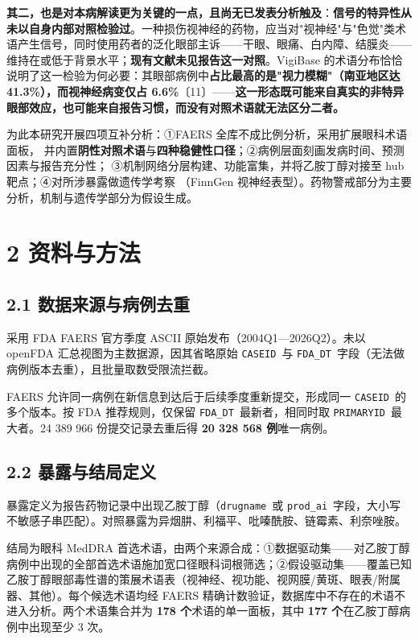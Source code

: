 \documentclass[UTF8,fontset=windows,11pt]{ctexart}
\begin{document}
\textbf{其二，也是对本病解读更为关键的一点，且尚无已发表分析触及}：\textbf{信号的特异性从未以自身内部对照检验过}。一种损伤视神经的药物，应当对"视神经"与"色觉"类术语产生信号，同时使用药者的泛化眼部主诉——干眼、眼痛、白内障、结膜炎——维持在或低于背景水平；\textbf{现有文献未见报告这一对照}。VigiBase 的术语分布恰恰说明了这一检验为何必要：其眼部病例中\textbf{占比最高的是"视力模糊"（南亚地区达 41.3\%），而视神经病变仅占 6.6\%}〔11〕——\textbf{这一形态既可能来自真实的非特异眼部效应，也可能来自报告习惯，而没有对照术语就无法区分二者。}

为此本研究开展四项互补分析：①FAERS 全库不成比例分析，采用扩展眼科术语面板， 并内置\textbf{阴性对照术语}与\textbf{四种稳健性口径}；②病例层面刻画发病时间、预测因素与报告充分性； ③机制网络分层构建、功能富集，并将乙胺丁醇对接至 hub 靶点；④对所涉暴露做遗传学考察 （FinnGen 视神经表型）。药物警戒部分为主要分析，机制与遗传学部分为假设生成。

\section{2 资料与方法}

\subsection{2.1 数据来源与病例去重}

采用 FDA FAERS 官方季度 ASCII 原始发布（2004Q1—2026Q2）。未以 openFDA 汇总视图为主数据源，因其省略原始 \texttt{CASEID}\ 与 \texttt{FDA\_DT}\ 字段（无法做病例版本去重），且批量取数受限流拦截。

FAERS 允许同一病例在新信息到达后于后续季度重新提交，形成同一 \texttt{CASEID}\ 的多个版本。按 FDA 推荐规则，仅保留 \texttt{FDA\_DT}\ 最新者，相同时取 \texttt{PRIMARYID}\ 最大者。24 389 966 份提交记录去重后得 \textbf{20 328 568 例}唯一病例。

\subsection{2.2 暴露与结局定义}

暴露定义为报告药物记录中出现乙胺丁醇（\texttt{drugname}\ 或 \texttt{prod\_ai}\ 字段，大小写不敏感子串匹配）。对照暴露为异烟肼、利福平、吡嗪酰胺、链霉素、利奈唑胺。

结局为眼科 MedDRA 首选术语，由两个来源合成：①数据驱动集——对乙胺丁醇病例中出现的全部首选术语施加宽口径眼科词根筛选；②假设驱动集——覆盖已知乙胺丁醇眼部毒性谱的策展术语表（视神经、视功能、视网膜/黄斑、眼表/附属器、其他）。每个候选术语均经 FAERS 精确计数验证，数据库中不存在的术语不进入分析。两个术语集合并为 \textbf{178 个}术语的单一面板，其中 \textbf{177 个}在乙胺丁醇病例中出现至少 3 次。
\end{document}
